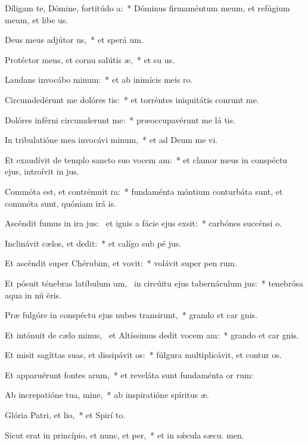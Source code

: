 \item Díligam te, Dómine, fortitúdo a:~* Dóminus firmaméntum meum, et refúgium meum, et libe us.
\item Deus meus adjútor us,~* et sperá  um.
\item Protéctor meus, et cornu salútis æ,~* et su us.
\item Laudans invocábo minum:~* et ab inimícis meis  ro.
\item Circumdedérunt me dolóres tis:~* et torréntes iniquitátis conrunt me.
\item Dolóres inférni circumderunt me:~* præoccupavérunt me lá tis.
\item In tribulatióne mea invocávi minum,~* et ad Deum me vi.
\item Et exaudívit de templo sancto suo vocem am:~* et clamor meus in conspéctu ejus, introívit in  jus.
\item Commóta est, et contrémuit ra:~* fundaménta móntium conturbáta sunt, et commóta sunt, quóniam irá  is.
\item Ascéndit fumus in ira jus:~\pscross{} et ignis a fácie ejus exsit:~* carbónes succénsi   o.
\item Inclinávit cælos, et dedit:~* et calígo sub pé jus.
\item Et ascéndit super Chérubim, et vovit:~* volávit super pen rum.
\item Et pósuit ténebras latíbulum um,~\pscross{} in circúitu ejus tabernáculum jus:~* tenebrósa aqua in nú ëris.
\item Præ fulgóre in conspéctu ejus nubes transirunt,~* grando et car gnis.
\item Et intónuit de cælo minus,~\pscross{} et Altíssimus dedit vocem am:~* grando et car gnis.
\item Et misit sagíttas suas, et dissipávit os:~* fúlgura multiplicávit, et contur os.
\item Et apparuérunt fontes arum,~* et reveláta sunt fundaménta or rum:
\item Ab increpatióne tua, mine,~* ab inspiratióne spíritus  æ.
\item Glória Patri, et lio,~* et Spirí to.
\item Sicut erat in princípio, et nunc, et per,~* et in sǽcula sæcu. men.
